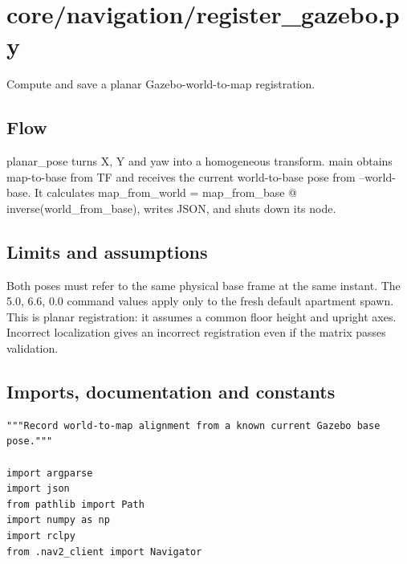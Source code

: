 \documentclass[11pt,a4paper]{book}
\begin{document}
\chapter{core/navigation/register\_gazebo.py}

Compute and save a planar Gazebo-world-to-map registration.

\section*{Flow}

planar\_pose turns X, Y and yaw into a homogeneous transform. main obtains map-to-base from TF and receives the current world-to-base pose from --world-base. It calculates map\_from\_world = map\_from\_base @ inverse(world\_from\_base), writes JSON, and shuts down its node.

\section*{Limits and assumptions}

Both poses must refer to the same physical base frame at the same instant. The 5.0, 6.6, 0.0 command values apply only to the fresh default apartment spawn. This is planar registration: it assumes a common floor height and upright axes. Incorrect localization gives an incorrect registration even if the matrix passes validation.

\section{Imports, documentation and constants}

\begin{lstlisting}[firstnumber=1]
"""Record world-to-map alignment from a known current Gazebo base pose."""

import argparse
import json
from pathlib import Path
import numpy as np
import rclpy
from .nav2_client import Navigator


\end{lstlisting}
\end{document}
